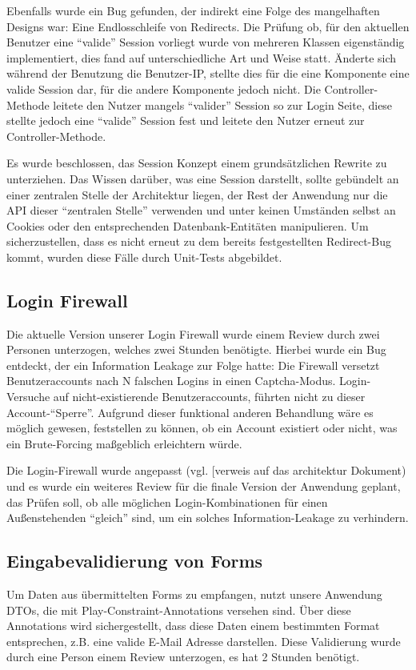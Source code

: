 \documentclass[12pt,DIV14,BCOR10mm,a4paper,twoside,parskip=half-,headsepline,headinclude,english,ngerman,bibliography=totocnumbered]{scrreprt}
\begin{document}
Ebenfalls wurde ein Bug gefunden, der indirekt eine Folge des mangelhaften Designs war: Eine Endlosschleife von Redirects. Die Prüfung ob, für den aktuellen Benutzer eine \enquote{valide} Session vorliegt wurde von mehreren Klassen eigenständig implementiert, dies fand auf unterschiedliche Art und Weise statt. Änderte sich während der Benutzung die Benutzer-IP, stellte dies für die eine Komponente eine valide Session dar, für die andere Komponente jedoch nicht. Die Controller-Methode leitete den Nutzer mangels \enquote{valider} Session so zur Login Seite, diese stellte jedoch eine \enquote{valide} Session fest und leitete den Nutzer erneut zur Controller-Methode.

Es wurde beschlossen, das Session Konzept einem grundsätzlichen Rewrite zu unterziehen. Das Wissen darüber, was eine Session darstellt, sollte gebündelt an einer zentralen Stelle der Architektur liegen, der Rest der Anwendung nur die API dieser \enquote{zentralen Stelle} verwenden und unter keinen Umständen selbst an Cookies oder den entsprechenden Datenbank-Entitäten manipulieren. Um sicherzustellen, dass es nicht erneut zu dem bereits festgestellten Redirect-Bug kommt, wurden diese Fälle durch Unit-Tests abgebildet.

\subsection{Login Firewall}
Die aktuelle Version unserer Login Firewall wurde einem Review durch zwei Personen unterzogen, welches zwei Stunden benötigte. Hierbei wurde ein Bug entdeckt, der ein Information Leakage zur Folge hatte: Die Firewall versetzt Benutzeraccounts nach N falschen Logins in einen Captcha-Modus. Login-Versuche auf nicht-existierende Benutzeraccounts, führten nicht zu dieser Account-\enquote{Sperre}. Aufgrund dieser funktional anderen Behandlung wäre es möglich gewesen, feststellen zu können, ob ein Account existiert oder nicht, was ein Brute-Forcing maßgeblich erleichtern würde.

Die Login-Firewall wurde angepasst (vgl. [verweis auf das architektur Dokument) und es wurde ein weiteres Review für die finale Version der Anwendung geplant, das Prüfen soll, ob alle möglichen Login-Kombinationen für einen Außenstehenden \enquote{gleich} sind, um ein solches Information-Leakage zu verhindern.

\subsection{Eingabevalidierung von Forms}
Um Daten aus übermittelten Forms zu empfangen, nutzt unsere Anwendung DTOs, die mit Play-Constraint-Annotations versehen sind. Über diese Annotations wird sichergestellt, dass diese Daten einem bestimmten Format entsprechen, z.B. eine valide E-Mail Adresse darstellen. Diese Validierung wurde durch eine Person einem Review unterzogen, es hat 2 Stunden benötigt.
\end{document}
